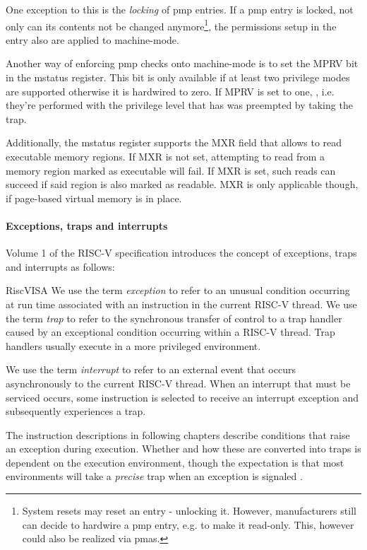 One exception to this is the \textit{locking} of \gls{pmp} entries.
If a \gls{pmp} entry is locked, not only can its contents not be changed anymore\footnote{%
    System resets may reset an entry - unlocking it.
    However, manufacturers still can decide to hardwire a \gls{pmp} entry, e.g. to make it read-only.
    This, however could also be realized via \glspl{pma}.
}, the permissions setup in the entry also are applied to machine-mode.

Another way of enforcing \gls{pmp} checks onto machine-mode is to set the MPRV bit in the \gls{mstatus} register.
This bit is only available if at least two privilege modes are supported otherwise it is hardwired to zero.
If MPRV is set to one, , i.e. they're performed with the privilege level that has was preempted by taking the trap.

Additionally, the \gls{mstatus} register supports the MXR field that allows to read executable memory regions.
If MXR is not set, attempting to read from a memory region marked as executable will fail.
If MXR is set, such reads can succeed if said region is also marked as readable.
MXR is only applicable though, if page-based virtual memory is in place.

\paragraph{Exceptions, traps and interrupts}

Volume 1 of the RISC-V specification \cite{RiscVISA} introduces the concept of exceptions, traps and interrupts as follows:
\begin{displaycquote}{RiscVISA}
    We use the term \textit{exception} to refer to an unusual condition occurring at run time associated with an instruction in the current RISC-V thread.
    We use the term \textit{trap} to refer to the synchronous transfer of control to a trap handler caused by an exceptional condition occurring within a RISC-V thread.
    Trap handlers usually execute in a more privileged environment.

    We use the term \textit{interrupt} to refer to an external event that occurs asynchronously to the current RISC-V thread.
    When an interrupt that must be serviced occurs, some instruction is selected to receive an interrupt exception and subsequently experiences a trap.

    The instruction descriptions in following chapters describe conditions that raise an exception during execution.
    Whether and how these are converted into traps is dependent on the execution environment, though the expectation is that most environments will take a \textit{precise} trap when an exception is signaled \textelp{}.
\end{displaycquote}

